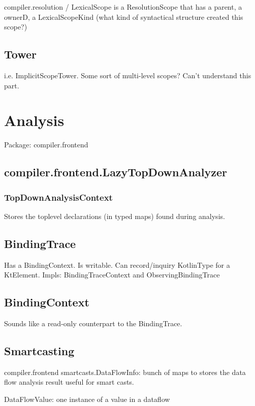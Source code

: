 \documentclass{article}
\begin{document}
compiler.resolution / LexicalScope is a ResolutionScope that has a parent, a ownerD, a LexicalScopeKind (what kind of syntactical structure created this scope?)

\subsection{Tower}

i.e. ImplicitScopeTower. Some sort of multi-level scopes? Can't understand this part.

\section{Analysis}

Package: compiler.frontend

\subsection{compiler.frontend.LazyTopDownAnalyzer}

\subsubsection{TopDownAnalysisContext}

Stores the toplevel declarations (in typed maps) found during analysis.

\subsection{BindingTrace}

Has a BindingContext. Is writable. Can record/inquiry KotlinType for a KtElement.
Impls: BindingTraceContext and ObservingBindingTrace

\subsection{BindingContext}

Sounds like a read-only counterpart to the BindingTrace.

\subsection{Smartcasting}

compiler.frontend smartcasts.DataFlowInfo: bunch of maps to stores the data flow analysis result useful for smart casts.

DataFlowValue: one instance of a value in a dataflow
\end{document}
